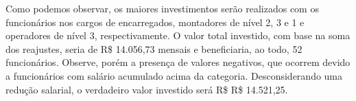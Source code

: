 \documentclass[a4paper, 12pt]{CSSullivanBusinessReport}
\begin{document}
Como podemos observar, os maiores investimentos serão realizados com os funcionários nos cargos de encarregados, montadores de nível 2, 3 e 1 e operadores de nível 3, respectivamente. O valor total investido, com base na soma dos reajustes, seria de R\$ 14.056,73 mensais e beneficiaria, ao todo, 52 funcionários. Observe, porém a presença de valores negativos, que ocorrem devido a funcionários com salário acumulado acima da categoria. Desconsiderando uma redução salarial, o verdadeiro valor investido será R\$  R\$ 14.521,25.
\end{document}
